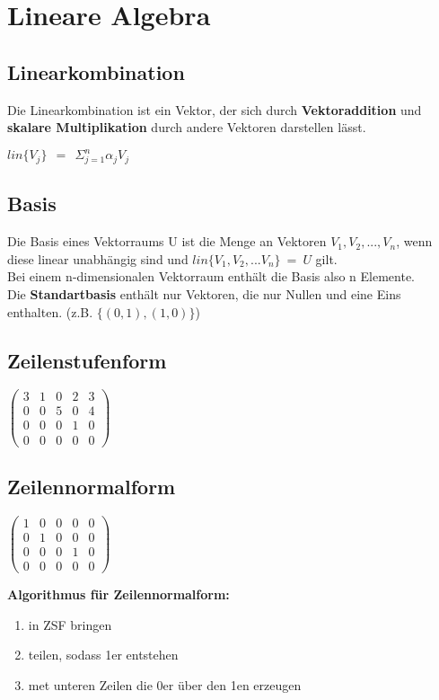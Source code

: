 \documentclass[a4paper,12pt]{article} %
\begin{document}
\section{Lineare Algebra}
\subsection{Linearkombination}
Die Linearkombination ist ein Vektor, der sich durch \textbf{Vektoraddition} und \textbf{skalare Multiplikation} durch andere Vektoren darstellen lässt.
\begin{center}
$lin \{ V_j \} \ \ = \ \ \Sigma_{j=1}^n \alpha_j V_j$
\end{center}
\subsection{Basis}
Die Basis eines Vektorraums U ist die Menge an Vektoren $V_1,V_2,...,V_n$, wenn diese linear unabhängig sind und $lin\{V_1,V_2,...V_n\} \ = \ U$ gilt.\\
Bei einem n-dimensionalen Vektorraum enthält die Basis also n Elemente.\\
Die \textbf{Standartbasis} enthält nur Vektoren, die nur Nullen und eine Eins enthalten. (z.B. $\{(0,1),(1,0)\}$)

\subsection{Zeilenstufenform}

\begin{center}
  $
\left(
   \begin{array}{ccccc}
3 & 1 & 0 & 2 & 3\\
0 & 0 & 5 & 0 & 4\\
0 & 0 & 0 & 1 & 0\\
0 & 0 & 0 & 0 & 0
   \end{array}
\right)
$
  \end{center}  
\subsection{Zeilennormalform}
\begin{center}
  $
\left(
   \begin{array}{ccccc}
1 & 0 & 0 & 0 & 0\\
0 & 1 & 0 & 0 & 0\\
0 & 0 & 0 & 1 & 0\\
0 & 0 & 0 & 0 & 0
   \end{array}
\right)
$
  \end{center}  
\textbf{Algorithmus für Zeilennormalform:}
\begin{enumerate}
\item in ZSF bringen
\item teilen, sodass 1er entstehen
\item met unteren Zeilen die 0er über den 1en erzeugen
\end{enumerate}
\end{document}
